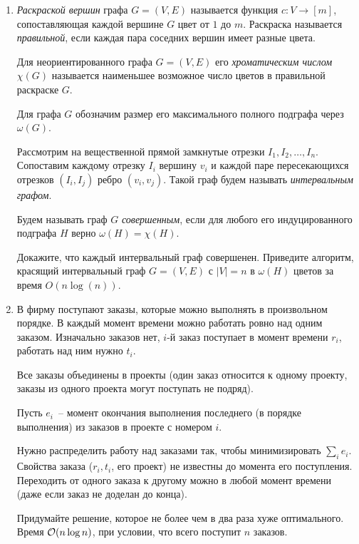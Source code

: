 \begin{enumerate}
  \item
    \textit{Раскраской вершин} графа $G = (V, E)$ называется функция $c: V \to [m]$, сопоставляющая каждой вершине $G$ цвет от $1$ до $m$.
 	Раскраска называется \textit{правильной}, если каждая пара соседних вершин имеет разные цвета.

 	Для неориентированного графа $G = (V, E)$ его \textit{хроматическим числом} $\chi(G)$ называется наименьшее возможное число цветов в правильной раскраске $G$.

 	Для графа $G$ обозначим размер его максимального полного подграфа через $\omega(G)$.

 	Рассмотрим на вещественной прямой замкнутые отрезки $I_1, I_2, \dots, I_n$. Сопоставим каждому отрезку $I_i$ вершину $v_i$
 	и каждой паре пересекающихся отрезков $(I_i, I_j)$ ребро $(v_i, v_j)$. Такой граф будем называть \textit{интервальным графом}.

 	Будем называть граф $G$ \textit{совершенным}, если для любого его индуцированного подграфа $H$ верно $\omega(H) = \chi(H)$.

 	Докажите, что каждый интервальный граф совершенен. Приведите алгоритм, красящий интервальный граф $G = (V, E)$ с $|V| = n$ в $\omega(H)$ цветов за время $O(n \log(n))$.

  \item
 	В фирму поступают заказы, которые можно выполнять в произвольном
 	порядке. В каждый момент времени можно работать ровно над одним
 	заказом.  Изначально заказов нет, $i$-й заказ поступает в момент
 	времени $r_i$, работать над ним нужно $t_i$.

 	Все заказы объединены в проекты (один заказ относится к одному
 	проекту, заказы из одного проекта могут поступать не подряд).

 	Пусть $e_i$~-- момент окончания выполнения последнего (в порядке
 	выполнения) из заказов в проекте с номером $i$.

 	Нужно распределить работу над заказами так, чтобы минимизировать
 	$\sum_i e_i$. Свойства заказа ($r_i, t_i$, его проект) не известны
 	до момента его поступления.  Переходить от одного заказа к другому
 	можно в любой момент времени (даже если заказ не доделан до конца).

 	Придумайте решение, которое не более чем в два раза хуже
 	оптимального.  Время $\mathcal{O}(n \log n)$, при условии, что всего поступит $n$ заказов.

\end{enumerate}

\newpage

